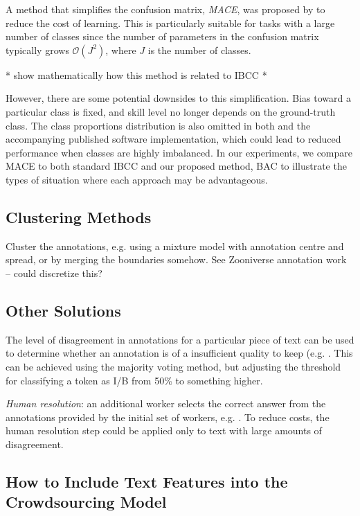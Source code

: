 A method that simplifies the confusion matrix, \emph{MACE}, was proposed by \cite{hovy2013learning}
to reduce the cost of learning. This is particularly suitable for tasks with a large number of classes
since the number of parameters in the confusion matrix typically grows $\mathcal{O}(J^2)$, where $J$ is the number of classes.

* show mathematically how this method is related to IBCC *

However, there are some potential downsides to this simplification. Bias toward a particular class is fixed,
and skill level no longer depends on the ground-truth class. The class proportions distribution is also omitted
in both \cite{hovy2013learning} and the accompanying published software implementation, which
could lead to reduced performance when classes are highly imbalanced. 
In our experiments, we compare MACE to both standard IBCC and our proposed method, BAC to illustrate the 
types of situation where each approach may be advantageous. 

\subsection{Clustering Methods}

Cluster the annotations, e.g. using a mixture model with annotation centre and spread, or by merging the boundaries somehow. See Zooniverse annotation work -- could discretize this?

\subsection{Other Solutions}

The level of disagreement in annotations for a particular piece of text can be used to determine whether an annotation is of a insufficient quality to keep (e.g. \cite{sayeed2011crowdsourcing,hsueh2009data}. This can be achieved using the majority voting method, but adjusting the threshold for classifying a token as I/B from 50\% to something higher. 

\emph{Human resolution}: an additional worker selects the correct answer from the annotations provided by the initial set of workers, e.g. \cite{dagan2016specifying}. To reduce costs, the human resolution step could be applied only to text with large amounts of disagreement.

\subsection{How to Include Text Features into the Crowdsourcing Model}

